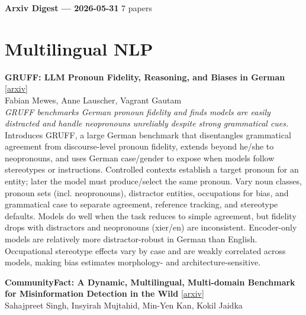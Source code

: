 \documentclass[12pt,letterpaper]{article}
\begin{document}
{\footnotesize\textbf{Arxiv Digest --- 2026-05-31} \hfill 7 papers}

\smallskip

\section*{Multilingual NLP}

{\small\textbf{GRUFF: LLM Pronoun Fidelity, Reasoning, and Biases in German}} {\scriptsize[\href{https://arxiv.org/abs/2605.30214}{arxiv}]}\\
{\scriptsize Fabian Mewes, Anne Lauscher, Vagrant Gautam}\\

{\small\textit{GRUFF benchmarks German pronoun fidelity and finds models are easily distracted and handle neopronouns unreliably despite strong grammatical cues.}}\\[1pt]
{\footnotesize Introduces GRUFF, a large German benchmark that disentangles grammatical agreement from discourse-level pronoun fidelity, extends beyond he/she to neopronouns, and uses German case/gender to expose when models follow stereotypes or instructions. Controlled contexts establish a target pronoun for an entity; later the model must produce/select the same pronoun. Vary noun classes, pronoun sets (incl. neopronouns), distractor entities, occupations for bias, and grammatical case to separate agreement, reference tracking, and stereotype defaults. Models do well when the task reduces to simple agreement, but fidelity drops with distractors and neopronouns (xier/en) are inconsistent. Encoder-only models are relatively more distractor-robust in German than English. Occupational stereotype effects vary by case and are weakly correlated across models, making bias estimates morphology- and architecture-sensitive.}

\medskip

{\small\textbf{CommunityFact: A Dynamic, Multilingual, Multi-domain Benchmark for Misinformation Detection in the Wild}} {\scriptsize[\href{https://arxiv.org/abs/2605.30241}{arxiv}]}\\
{\scriptsize Sahajpreet Singh, Insyirah Mujtahid, Min-Yen Kan, Kokil Jaidka}\\
\end{document}
